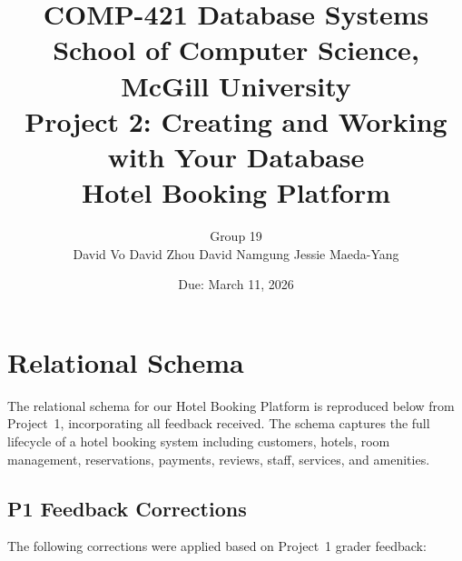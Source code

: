 \documentclass[12pt,letterpaper]{article}
\title{
    \vspace{-1cm}
    \textbf{COMP-421 Database Systems}\\[0.3em]
    \large School of Computer Science, McGill University\\[0.5em]
    \LARGE\textbf{Project 2: Creating and Working with Your Database}\\[0.3em]
    \large Hotel Booking Platform
}
\author{
    Group 19\\
    David Vo \quad David Zhou \quad David Namgung \quad Jessie Maeda-Yang
}
\date{Due: March 11, 2026}
\begin{document}
\maketitle
\tableofcontents
\newpage

\section{Relational Schema}

The relational schema for our Hotel Booking Platform is reproduced below from Project~1, incorporating all feedback received. The schema captures the full lifecycle of a hotel booking system including customers, hotels, room management, reservations, payments, reviews, staff, services, and amenities.

\subsection*{P1 Feedback Corrections}

The following corrections were applied based on Project~1 grader feedback:
\end{document}

